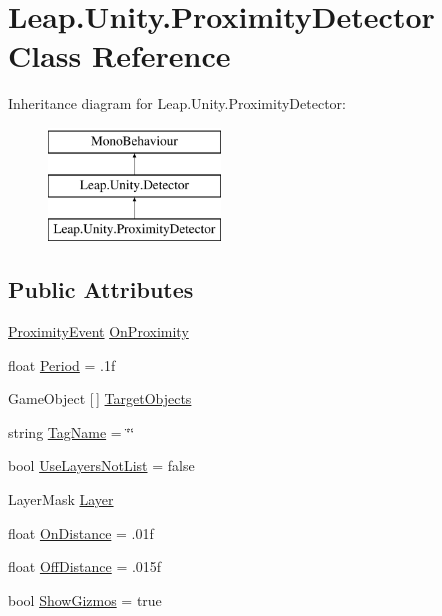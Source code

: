 \hypertarget{class_leap_1_1_unity_1_1_proximity_detector}{}\section{Leap.\+Unity.\+Proximity\+Detector Class Reference}
\label{class_leap_1_1_unity_1_1_proximity_detector}
Inheritance diagram for Leap.\+Unity.\+Proximity\+Detector\+:\begin{figure}[H]
\begin{center}
\leavevmode
\includegraphics[height=3.000000cm]{class_leap_1_1_unity_1_1_proximity_detector}
\end{center}
\end{figure}
\subsection*{Public Attributes}
\begin{DoxyCompactItemize}
\item 
\mbox{\hyperlink{class_leap_1_1_unity_1_1_proximity_event}{Proximity\+Event}} \mbox{\hyperlink{class_leap_1_1_unity_1_1_proximity_detector_a6cabbb40727dcb3b5d8577982a6516cc}{On\+Proximity}}
\item 
float \mbox{\hyperlink{class_leap_1_1_unity_1_1_proximity_detector_a630cf8c292fbdf90459f2e41ca43c890}{Period}} = .\+1f
\item 
Game\+Object \mbox{[}$\,$\mbox{]} \mbox{\hyperlink{class_leap_1_1_unity_1_1_proximity_detector_a5a588af860f86f0116c919fa8fada465}{Target\+Objects}}
\item 
string \mbox{\hyperlink{class_leap_1_1_unity_1_1_proximity_detector_a4142f9e67a2936e6c1c56521c566f710}{Tag\+Name}} = \char`\"{}\char`\"{}
\item 
bool \mbox{\hyperlink{class_leap_1_1_unity_1_1_proximity_detector_ace1a6d3060bc3f78861eccb6bd1bd612}{Use\+Layers\+Not\+List}} = false
\item 
Layer\+Mask \mbox{\hyperlink{class_leap_1_1_unity_1_1_proximity_detector_a03df6304fe6e81340a4e5d53a904d6ee}{Layer}}
\item 
float \mbox{\hyperlink{class_leap_1_1_unity_1_1_proximity_detector_aae0de1f759535b5f204722c243241746}{On\+Distance}} = .\+01f
\item 
float \mbox{\hyperlink{class_leap_1_1_unity_1_1_proximity_detector_a25c70c8a58a321da905fb43f825d6377}{Off\+Distance}} = .\+015f
\item 
bool \mbox{\hyperlink{class_leap_1_1_unity_1_1_proximity_detector_a168a600ee9c5b723b2ab546958429cb8}{Show\+Gizmos}} = true
\end{DoxyCompactItemize}
